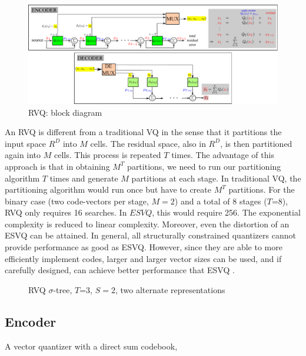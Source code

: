 \begin{figure}				
	\includegraphics[width=1\textwidth]{figs/RVQ_blockDiagram.pdf}
	\caption{RVQ: block diagram}
	\label{fig:RVQ_block_diagram}
\end{figure}

An RVQ is different from a traditional VQ in the sense that it partitions the input space $R^D$ into $M$ cells.  The residual space, also in $R^D$, is then partitioned again into $M$ cells.  This process is repeated $T$ times.  The advantage of this approach is that in obtaining $M^T$ partitions, we need to run our partitioning algorithm $T$ times and generate $M$ partitions at each stage.  In traditional VQ, the partitioning algorithm would run once but have to create $M^T$ partitions.  For the binary case (two code-vectors per stage, $M=2$) and a total of 8 stages ($T$=8), RVQ only requires 16 searches.  In $ESVQ$, this would require 256.  The exponential complexity is reduced to linear complexity.  Moreover, even the distortion of an ESVQ can be attained.  In general, all structurally constrained quantizers cannot provide performance as good as ESVQ.  However, since they are able to more efficiently implement codes, larger and larger vector sizes can be used, and if carefully designed, can achieve better performance that ESVQ \cite{1996_JNL_AdvancesRVQ_Barnes}.

\begin{figure}[ht]
	\centering	
	\caption{RVQ $\sigma$-tree, $T$=3, $S=2$, two alternate representations} 
	\label{fig:RVQ_sigma_tree}				
\end{figure}


\subsection{Encoder}
A vector quantizer with a direct sum codebook,

